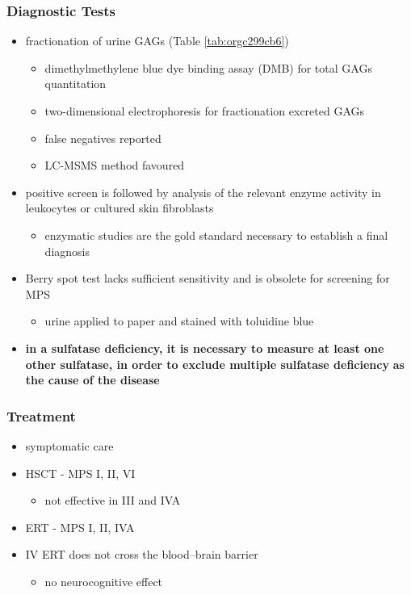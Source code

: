 \documentclass[12pt]{scrartcl}
\begin{document}
\subsubsection{Diagnostic Tests}
\label{sec:org29406ec}
\begin{itemize}
\item fractionation of urine GAGs (Table \ref{tab:orgc299cb6})
\begin{itemize}
\item dimethylmethylene blue dye binding assay (DMB) for total GAGs
quantitation
\item two-dimensional electrophoresis for fractionation excreted GAGs
\item false negatives reported
\item LC-MSMS method favoured
\end{itemize}
\item positive screen is followed by analysis of the relevant enzyme
activity in leukocytes or cultured skin fibroblasts
\begin{itemize}
\item enzymatic studies are the gold standard necessary to establish a
final diagnosis
\end{itemize}
\item Berry spot test lacks sufficient sensitivity and is obsolete for
screening for MPS
\begin{itemize}
\item urine applied to paper and stained with toluidine blue
\end{itemize}
\item \textbf{in a sulfatase deficiency, it is necessary to measure at least one}
\textbf{other sulfatase, in order to exclude multiple sulfatase deficiency}
\textbf{as the cause of the disease}
\end{itemize}

\subsubsection{Treatment}
\label{sec:org4be5777}
\begin{itemize}
\item symptomatic care
\item HSCT - MPS I, II, VI
\begin{itemize}
\item not effective in III and IVA
\end{itemize}
\item ERT - MPS I, II, IVA
\item IV ERT does not cross the blood–brain barrier
\begin{itemize}
\item no neurocognitive effect
\end{itemize}
\end{itemize}
\end{document}
